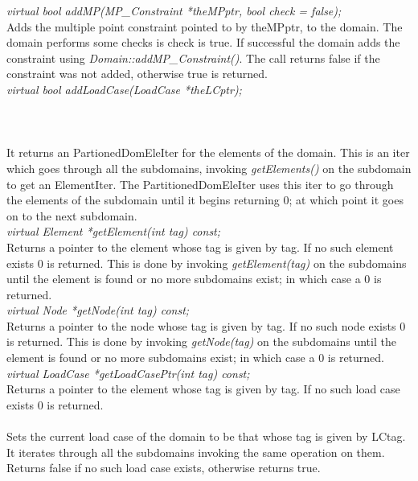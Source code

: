 {\em virtual bool addMP(MP\_Constraint *theMPptr, bool check = false);}  \\
Adds the multiple point constraint pointed to by theMPptr, to the
domain. The domain performs some checks is \p check is true. If
successful the domain adds the constraint using {\em
Domain::addMP\_Constraint()}. The call returns \p false if
the constraint was not added, otherwise \p true is returned. \\  


{\em virtual bool addLoadCase(LoadCase *theLCptr);}  \\
\\

  \\
 \\
It returns an \p PartionedDomEleIter for the elements of the domain. This
is an iter which goes through all the subdomains, invoking {\em
getElements()} on the subdomain to get an ElementIter. The
PartitionedDomEleIter uses this iter to go through the elements of the
subdomain until it begins returning $0$; at which point it goes on to
the next subdomain. \\

{\em virtual  Element *getElement(int tag) const;}\\
Returns a pointer to the element whose tag is given by \p tag. If
no such element exists $0$ is returned. This is done by invoking {\em
getElement(tag)} on the subdomains until the element is found or no
more subdomains exist; in which case a $0$ is returned. \\

{\em virtual  Node *getNode(int tag) const;}\\
Returns a pointer to the node whose tag is given by \p tag. If
no such node exists $0$ is returned. This is done by invoking {\em
getNode(tag)} on the subdomains until the element is found or no
more subdomains exist; in which case a $0$ is returned. \\

{\em virtual  LoadCase *getLoadCasePtr(int tag) const;}\\
Returns a pointer to the element whose tag is given by \p tag. If
no such load case exists $0$ is returned. \\

 \\
Sets the current load case of the domain to be that whose tag is given
by LCtag. It iterates through all the subdomains invoking the same
operation on them. Returns \p false if no such load case exists, otherwise
returns \p true. \\

